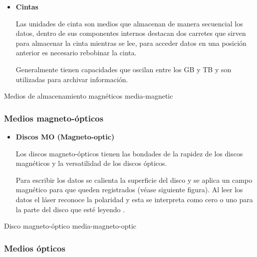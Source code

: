 \begin{itemize}
  \item \textbf{Cintas}

Las unidades de cinta son medios que almacenan de manera secuencial los datos, dentro de sus componentes internos destacan dos carretes que sirven para almacenar la cinta mientras se lee, para acceder datos en una posici\'{o}n anterior es necesario rebobinar la cinta.

Generalmente tienen capacidades que oscilan entre los \textsc{GB} y \textsc{TB}  \cite{_powervault_????} y son utilizadas para archivar informaci\'{o}n.

\end{itemize}

\diagramblock
{Medios de almacenamiento magn\'{e}ticos}
{media-magnetic}
{
 {
  
 }
}

      \subsubsection*{Medios magneto-\'{o}pticos}

\begin{itemize}

  \item \textbf{Discos MO (Magneto-optic)}

Los discos magneto-\'{o}pticos tienen las bondades de la rapidez de los discos magn\'{e}ticos y la versatilidad de los discos \'{o}pticos.

Para escribir los datos se calienta la superficie del disco y se aplica un campo magn\'{e}tico para que queden registrados (v\'{e}ase siguiente figura). Al leer los datos el l\'{a}ser reconoce la polaridad y esta se interpreta como cero o uno para la parte del disco que est\'{e} leyendo \cite{_illustrated_????}.

\end{itemize}

\diagramblock
{Disco magneto-\'{o}ptico}
{media-magneto-optic}
{
 {
  
 }
}

      \subsubsection*{Medios \'{o}pticos}

